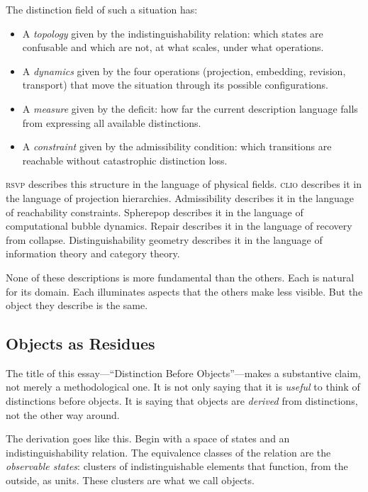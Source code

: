 \documentclass[12pt, letterpaper]{article}
\theoremstyle{remark}
\newcommand{\rsvp}{\textsc{rsvp}}
\newcommand{\clio}{\textsc{clio}}
\begin{document}
The distinction field of such a situation has:
\begin{itemize}
  \item A \emph{topology} given by the indistinguishability relation: which
    states are confusable and which are not, at what scales, under what
    operations.
  \item A \emph{dynamics} given by the four operations (projection, embedding,
    revision, transport) that move the situation through its possible
    configurations.
  \item A \emph{measure} given by the deficit: how far the current
    description language falls from expressing all available distinctions.
  \item A \emph{constraint} given by the admissibility condition: which
    transitions are reachable without catastrophic distinction loss.
\end{itemize}

\rsvp{} describes this structure in the language of physical fields.
\clio{} describes it in the language of projection hierarchies.
Admissibility describes it in the language of reachability constraints.
Spherepop describes it in the language of computational bubble dynamics.
Repair describes it in the language of recovery from collapse.
Distinguishability geometry describes it in the language of information
theory and category theory.

None of these descriptions is more fundamental than the others.
Each is natural for its domain.  Each illuminates aspects that the
others make less visible.  But the object they describe is the same.

\subsection{Objects as Residues}

The title of this essay---``Distinction Before Objects''---makes a
substantive claim, not merely a methodological one.  It is not only
saying that it is \emph{useful} to think of distinctions before objects.
It is saying that objects are \emph{derived} from distinctions, not the
other way around.

The derivation goes like this.  Begin with a space of states and an
indistinguishability relation.  The equivalence classes of the relation
are the \emph{observable states}: clusters of indistinguishable elements
that function, from the outside, as units.  These clusters are what we
call objects.
\end{document}
